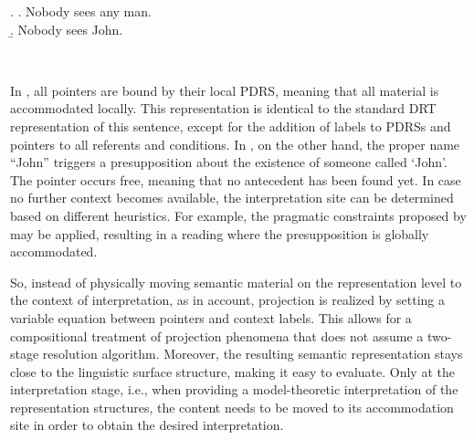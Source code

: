 \begin{flushleft}
\begin{minipage}{0.85\linewidth}
\begin{multicols}{2}
\ex. \a. Nobody sees any man.\\
\b. Nobody sees John.\\

\end{multicols}
\end{minipage}\\
\end{flushleft}

\noindent In \Last[a], all pointers are bound by their local PDRS, meaning
that all material is accommodated locally.  This representation is identical
to the standard DRT representation of this sentence, except for the addition
of labels to PDRSs and pointers to all referents and conditions. In
\Last[b], on the other hand, the proper name ``John'' triggers
a presupposition about the existence of someone called `John'. The pointer
occurs free, meaning that no antecedent has been found yet. In case no
further context becomes available, the interpretation site can be determined
based on different heuristics. For example, the pragmatic constraints
proposed by  may be applied, resulting
in a reading where the presupposition is globally accommodated. 

So, instead of physically moving semantic material on the representation
level to the context of interpretation, as in
 account, projection is realized by
setting a variable equation between pointers and context labels.  This
allows for a compositional treatment of projection phenomena that does not
assume a two-stage resolution algorithm.  Moreover, the resulting semantic
representation stays close to the linguistic surface structure, making it
easy to evaluate.  Only at the interpretation stage, i.e., when providing
a model-theoretic interpretation of the representation structures, the
content needs to be moved to its accommodation site in order to obtain the
desired interpretation.




